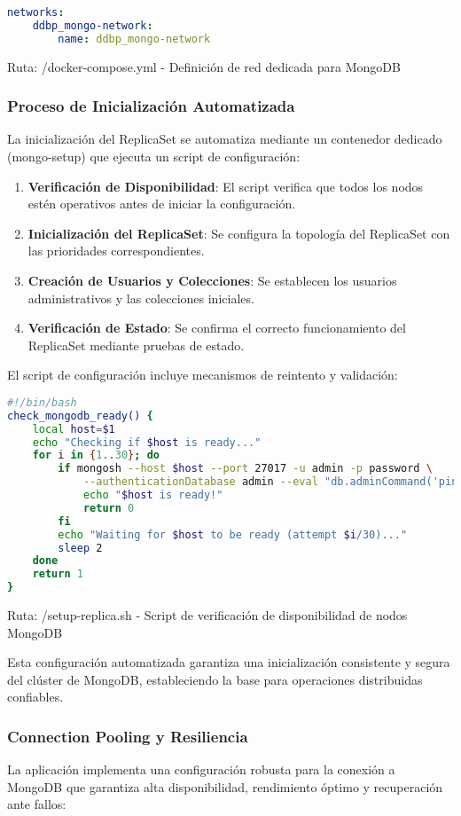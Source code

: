 \documentclass[12pt,letterpaper]{article}
\begin{document}
\begin{lstlisting}[language=yaml]
networks:
    ddbp_mongo-network:
        name: ddbp_mongo-network
\end{lstlisting}
\small{Ruta: /docker-compose.yml - Definición de red dedicada para MongoDB}

\subsubsection{Proceso de Inicialización Automatizada}
La inicialización del ReplicaSet se automatiza mediante un contenedor dedicado (mongo-setup) que ejecuta un script de configuración:

\begin{enumerate}
    \item \textbf{Verificación de Disponibilidad}: El script verifica que todos los nodos estén operativos antes de iniciar la configuración.
    \item \textbf{Inicialización del ReplicaSet}: Se configura la topología del ReplicaSet con las prioridades correspondientes.
    \item \textbf{Creación de Usuarios y Colecciones}: Se establecen los usuarios administrativos y las colecciones iniciales.
    \item \textbf{Verificación de Estado}: Se confirma el correcto funcionamiento del ReplicaSet mediante pruebas de estado.
\end{enumerate}

El script de configuración incluye mecanismos de reintento y validación:

\begin{lstlisting}[language=bash]
#!/bin/bash
check_mongodb_ready() {
    local host=$1
    echo "Checking if $host is ready..."
    for i in {1..30}; do
        if mongosh --host $host --port 27017 -u admin -p password \
            --authenticationDatabase admin --eval "db.adminCommand('ping')" &>/dev/null; then
            echo "$host is ready!"
            return 0
        fi
        echo "Waiting for $host to be ready (attempt $i/30)..."
        sleep 2
    done
    return 1
}
\end{lstlisting}
\small{Ruta: /setup-replica.sh - Script de verificación de disponibilidad de nodos MongoDB}

Esta configuración automatizada garantiza una inicialización consistente y segura del clúster de MongoDB, estableciendo la base para operaciones distribuidas confiables.

\subsubsection{Connection Pooling y Resiliencia}
La aplicación implementa una configuración robusta para la conexión a MongoDB que garantiza alta disponibilidad, rendimiento óptimo y recuperación ante fallos:
\end{document}
